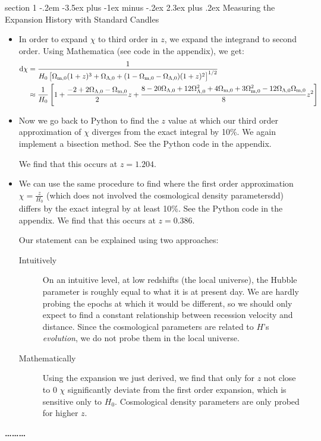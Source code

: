 \documentclass[12pt]{article}
\makeatletter
\newenvironment{problem}{\@startsection
	{section}
	{1}
	{-.2em}
	{-3.5ex plus -1ex minus -.2ex}
	{2.3ex plus .2ex}
	{\pagebreak[3]%
		\large\bf\noindent{Problem }
	}
}
{%
	\begin{center}\large\bf \ldots\ldots\ldots\end{center}}
\newcommand{\Omx}[1]{\ensuremath{\Omega_\mathrm{#1} } }
\makeatother
\begin{document}
	\begin{problem}{Measuring the Expansion History with Standard Candles}
		\begin{itemize}
			\item In order to expand $\chi$ to third order in $z$, we expand the integrand to second order.  Using Mathematica (see code in the appendix), we get: \begin{align*}
				\dif\chi &= \frac{1}{H_0 \left[ \Omx{m,0}(1+z)^3 + \Omx{\Lambda,0} + (1 - \Omx{m,0} - \Omx{\Lambda,0})(1+z)^2 \right]^{1/2}}
				\\
				&\approx \frac{1}{H_0} \left[1 + \frac{-2 + 2 \Omx{\Lambda,0} - \Omx{m,0}}{2} z + \frac{8 - 20 \Omx{\Lambda,0} + 12 \Omx{\Lambda,0}^2 + 4\Omx{m,0}  + 3\Omx{m,0}^2 - 12\Omx{\Lambda,0}\Omx{m,0} }{8} z^2 \right] 
			\end{align*}
			
			\item Now we go back to Python to find the $z$ value at which our third order approximation of $\chi$ diverges from the exact integral by 10\%.  We again implement a bisection method.  See the Python code in the appendix.
			
			We find that this occurs at $\boxed{z=1.204}$.
			
			\item We can use the same procedure to find where the first order approximation $\chi = \frac{z}{H_0}$ (which does not involved the cosmological density parametersdd) differs by the exact integral by at least 10\%.  See the Python code in the appendix.  We find that this occurs at $z=0.386$.
			
			Our statement can be explained using two approaches: \begin{description}
				\item[Intuitively] On an intuitive level, at low redshifts (the local universe), the Hubble parameter is roughly equal to what it is at present day.  We are hardly probing the epochs at which it would be different, so we should only expect to find a constant relationship between recession velocity and distance.  Since the cosmological parameters are related to $H$'s \textit{evolution}, we do not probe them in the local universe.
				
				\item[Mathematically] Using the expansion we just derived, we find that only for $z$ not close to $0$ $\chi$ significantly deviate from the first order expansion, which is sensitive only to $H_0$.  Cosmological density parameters are only probed for higher $z$. 
			\end{description}
		\end{itemize}
	\end{problem}
\end{document}
